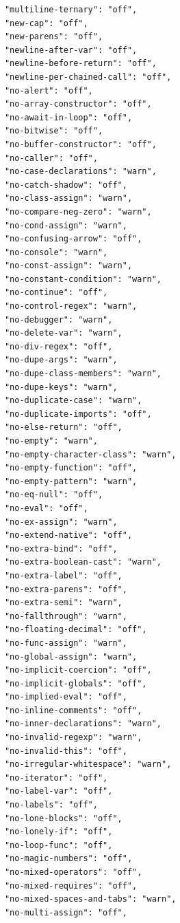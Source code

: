 \begin{figure}[h!]
\begin{small}
\begin{verbatim}
            "multiline-ternary": "off",
            "new-cap": "off",
            "new-parens": "off",
            "newline-after-var": "off",
            "newline-before-return": "off",
            "newline-per-chained-call": "off",
            "no-alert": "off",
            "no-array-constructor": "off",
            "no-await-in-loop": "off",
            "no-bitwise": "off",
            "no-buffer-constructor": "off",
            "no-caller": "off",
            "no-case-declarations": "warn",
            "no-catch-shadow": "off",
            "no-class-assign": "warn",
            "no-compare-neg-zero": "warn",
            "no-cond-assign": "warn",
            "no-confusing-arrow": "off",
            "no-console": "warn",
            "no-const-assign": "warn",
            "no-constant-condition": "warn",
            "no-continue": "off",
            "no-control-regex": "warn",
            "no-debugger": "warn",
            "no-delete-var": "warn",
            "no-div-regex": "off",
            "no-dupe-args": "warn",
            "no-dupe-class-members": "warn",
            "no-dupe-keys": "warn",
            "no-duplicate-case": "warn",
            "no-duplicate-imports": "off",
            "no-else-return": "off",
            "no-empty": "warn",
            "no-empty-character-class": "warn",
            "no-empty-function": "off",
            "no-empty-pattern": "warn",
            "no-eq-null": "off",
            "no-eval": "off",
            "no-ex-assign": "warn",
            "no-extend-native": "off",
            "no-extra-bind": "off",
            "no-extra-boolean-cast": "warn",
            "no-extra-label": "off",
            "no-extra-parens": "off",
            "no-extra-semi": "warn",
            "no-fallthrough": "warn",
            "no-floating-decimal": "off",
            "no-func-assign": "warn",
            "no-global-assign": "warn",
            "no-implicit-coercion": "off",
            "no-implicit-globals": "off",
            "no-implied-eval": "off",
            "no-inline-comments": "off",
            "no-inner-declarations": "warn",
            "no-invalid-regexp": "warn",
            "no-invalid-this": "off",
            "no-irregular-whitespace": "warn",
            "no-iterator": "off",
            "no-label-var": "off",
            "no-labels": "off",
            "no-lone-blocks": "off",
            "no-lonely-if": "off",
            "no-loop-func": "off",
            "no-magic-numbers": "off",
            "no-mixed-operators": "off",
            "no-mixed-requires": "off",
            "no-mixed-spaces-and-tabs": "warn",
            "no-multi-assign": "off",

\end{verbatim}
\end{small}
\end{figure}
